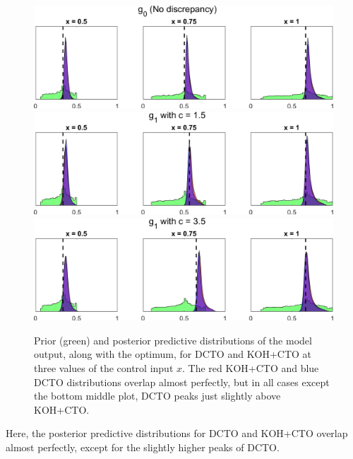 \documentclass[12pt]{article}
\begin{document}
\begin{figure}
	\centering
	\includegraphics[scale=0.85]{FIG_DCTO_KOHCTO_post_pred_dist_discrep0}\\
	\vspace{1em}
	\includegraphics[scale=0.85]{FIG_DCTO_KOHCTO_post_pred_dist_discrep1}\\
	\vspace{1em}
	\includegraphics[scale=0.85]{FIG_DCTO_KOHCTO_post_pred_dist_discrep2}
	\captionsetup{width=.85\linewidth}
	\caption{Prior (green) and posterior predictive distributions of the model output, along with the optimum, for DCTO and KOH+CTO at three values of the control input $x$. The red KOH+CTO and blue DCTO distributions overlap almost perfectly, but in all cases except the bottom middle plot, DCTO peaks just slightly above KOH+CTO.}
	\label{fig:01_post_dist}
\end{figure}
%
Here, the posterior predictive distributions for DCTO and KOH+CTO overlap almost perfectly, except for the slightly higher peaks of DCTO.
%
\end{document}
